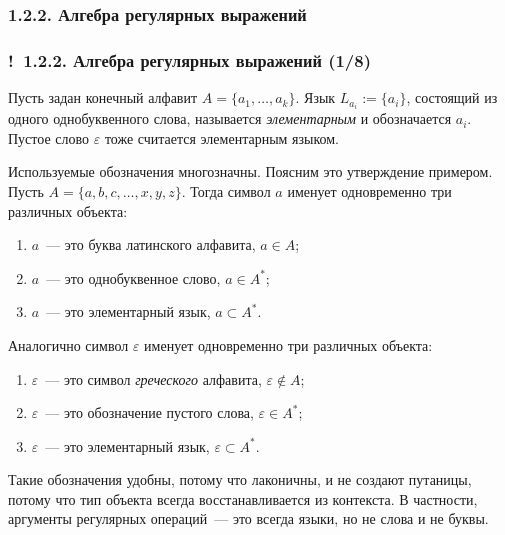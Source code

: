 \documentclass[mathserif,12pt,aspectratio=169]{beamer}
\def\emразделенной{\em разделенной}
\renewcommand{\index}[1]{}
\def\em#1{\it\color{blue}#1}
\def\odmkey#1#2{{\it\color{red} #1}\index{#2}}
\def\Assign{\operatorname{:=}}
\def\Tuple#1#2#3{{#1}_{#2},\dots,{#1}_{#3}}
\def\Ok{{\color{green}\textbf{!}\ }}
\begin{document}
\subsubsection{1.2.2. Алгебра регулярных выражений}\label{1.2.2.}
\begin{frame}
\frametitle{\Ok 1.2.2. Алгебра регулярных выражений (1/8)}

Пусть задан конечный алфавит $A=\{\Tuple{a}{1}{k}\}$. Язык $L_{a_i}\Assign\{a_i\}$,
состоящий из одного однобуквенного слова, называется
\odmkey{элементарным}{Язык!элементарный} и обозначается $a_i$.
Пустое слово $\varepsilon$ тоже считается элементарным языком.  

\begin{digress}
Используемые обозначения многозначны.
Поясним это утверждение примером.\\
Пусть $A=\{a,b,c,\dots,x,y,z\}$. 
Тогда символ $a$ именует одновременно три различных объекта:
\begin{enumerate}
\item $a$~--- это буква латинского алфавита, $a\in A$;\\[-2pt]
\item $a$~--- это однобуквенное слово, $a\in A^*$;\\[-2pt]
\item $a$~--- это элементарный язык, $a\subset A^*$.\\[-2pt]
\end{enumerate}
Аналогично символ $\varepsilon$ именует одновременно три различных объекта:
\begin{enumerate}
\item $\varepsilon$~--- это символ {\em греческого}
алфавита, $\varepsilon\not\in A$;\\[-2pt]
\item $\varepsilon$~--- это обозначение пустого слова, $\varepsilon\in A^*$;\\[-2pt]
\item $\varepsilon$~--- это элементарный язык, $\varepsilon\subset A^*$.\\[-2pt]
\end{enumerate}
Такие обозначения удобны, 
потому что лаконичны, и не создают 
путаницы, потому что 
тип объекта всегда восстанавливается из контекста. В частности,
аргументы регулярных операций~--- это 
всегда языки, но не слова и не буквы.
\end{digress} 
\end{frame}
\end{document}

